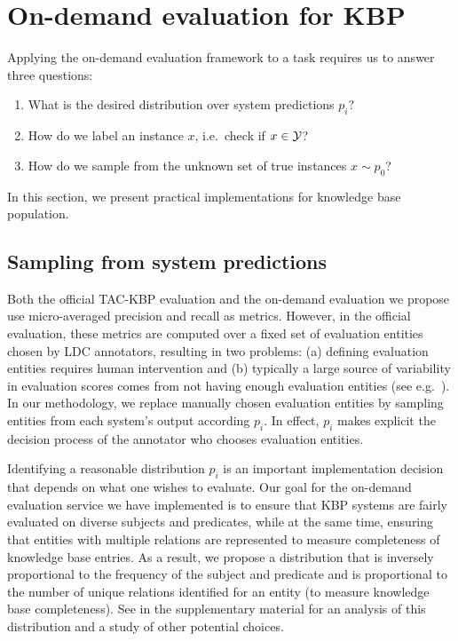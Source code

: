 \section{On-demand evaluation for KBP}
\label{sec:application}
Applying the on-demand evaluation framework to a task requires us to answer three questions:
\begin{enumerate}
  \item What is the desired distribution over system predictions $p_i$?
  \item How do we label an instance $x$, i.e.\ check if $x \in \mathcal{Y}$?
  \item How do we sample from the unknown set of true instances $x \sim p_0$?
\end{enumerate}
In this section, we present practical implementations for knowledge base population.

\subsection{Sampling from system predictions}
Both the official TAC-KBP evaluation and the on-demand evaluation we propose use micro-averaged precision and recall as metrics. However, in the official evaluation, these metrics are computed over a fixed set of evaluation entities chosen by LDC annotators, resulting in two problems: (a) defining evaluation entities requires human intervention and (b) typically a large source of variability in evaluation scores comes from not having enough evaluation entities (see e.g.\ \citep{webber2010measurement}). In our methodology, we replace manually chosen evaluation entities by sampling entities from each system’s output according $p_i$. In effect, $p_i$ makes explicit the decision process of the annotator who chooses evaluation entities.

Identifying a reasonable distribution $p_i$ is an important implementation decision that depends on what one wishes to evaluate.
Our goal for the on-demand evaluation service we have implemented is to ensure that KBP systems are fairly evaluated on diverse subjects and predicates, while at the same time, ensuring that entities with multiple relations are represented to measure completeness of knowledge base entries.
As a result, we propose a distribution that is inversely proportional to the frequency of the subject and predicate and is proportional to the number of unique relations identified for an entity (to measure knowledge base completeness).
See  in the supplementary material for an analysis of this distribution and a study of other potential choices.

